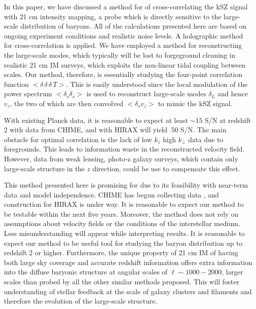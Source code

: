 In this paper, we have discussed a method for of cross-correlating the kSZ signal with 21 cm intensity mapping, a probe which is directly sensitive to the large-scale distribution of baryons. All of the calculations presented here are based on ongoing experiment conditions and realistic noise levels. A holographic method for cross-correlation is applied.  We have employed a method for reconstructing the large-scale modes, which typically will be lost to forgeground cleaning in realistic 21 cm IM surveys, which exploits the non-linear tidal coupling between scales. Our method, therefore, is essentially studying the four-point correlation function $<\delta\,\delta\,\delta\, T>$. This is easily understood since the local modulation of the power spectrum $<\delta_s \delta_s>$ is used to reconstruct large-scale modes $\delta_L$ and hence $v_z$, the two of which are then convolved $<\delta_s v_z> $ to mimic the kSZ signal. 

With existing Planck data, it is reasonable to expect at least $\sim15$ S/N at redshift 2 with data from CHIME, and with HIRAX will yield $~50$ S/N.  The main obstacle for optimal correlation is the lack of low $k_z$ high $k_\perp$ data due to foregrounds. This leads to information waste in the reconstructed velocity field.  However, data from weak lensing, photo-z galaxy surveys, which contain only large-scale structure in the $z$ direction, could be use to compensate this effect.
 
This method presented here is promising for due to its feasibility with near-term data and model independence. CHIME has begun collecting data , and construction for HIRAX is under way.  It is reasonable to expect our method to be testable within the next five years. Moreover, the method does not rely on assumptions about velocity fields or the conditions of the interstellar medium. Less misunderstanding will appear while interpreting results.  It is reasonable to expect our method to be useful tool for studying the baryon distribution up to redshift 2 or higher. Furthermore, the unique property of 21 cm IM of having both large sky coverage and accurate redshift information offers extra information into the diffuse baryonic structure at angular scales of $\ell\sim 1000-2000$, larger scales than probed by all the other similar methods proposed. This will foster understanding of stellar feedback at the scale of galaxy clusters and filaments and therefore the evolution of the large-scale structure.
